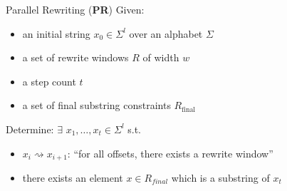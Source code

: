 \documentclass[11pt,usenames,dvipsnames,
hyperref={pdfencoding=auto,psdextra}]{beamer}
\newcommand*{\PR}{\textbf{PR}}
\newcommand{\Rfinal}{R_{\text{final}}}
\begin{document}
\begin{frame}{Parallel Rewriting (\PR{})}
  Given: 
  \begin{itemize}
    \item an initial string $x_0 \in \Sigma^l$ over an alphabet $\Sigma$ \\
    \item a set of rewrite windows $R$ of width $w$ \\ 
    \item a step count $t$ \\
    \item a set of final substring constraints $\Rfinal$ \\
  \end{itemize}
  Determine: $\exists$ $x_1, \ldots, x_t \in \Sigma^l$ s.t.\ 
  \begin{itemize}
    \item $x_i \rightsquigarrow x_{i+1}$: ``for all offsets, there exists a rewrite window''
    \item there exists an element $x \in R_{\mathit{final}}$ which is a substring of $x_t$
  \end{itemize}
\end{frame}
\end{document}
